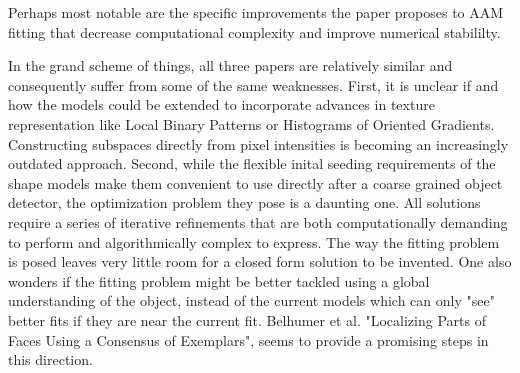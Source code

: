 \documentclass[12pt]{article}
\begin{document}
Perhaps most notable are the specific improvements the paper proposes to AAM fitting that decrease computational complexity and improve numerical stabililty.
\par
In the grand scheme of things, all three papers are relatively similar and consequently suffer from some of the same weaknesses.
First, it is unclear if and how the models could be extended to incorporate advances in texture representation like Local Binary Patterns or Histograms of Oriented Gradients.
Constructing subspaces directly from pixel intensities is becoming an increasingly outdated approach.
Second, while the flexible inital seeding requirements of the shape models make them convenient to use directly after a coarse grained object detector, the optimization problem they pose is a daunting one.
All solutions require a series of iterative refinements that are both computationally demanding to perform and algorithmically complex to express.
The way the fitting problem is posed leaves very little room for a closed form solution to be invented.
One also wonders if the fitting problem might be better tackled using a global understanding of the object, instead of the current models which can only "see" better fits if they are near the current fit.
Belhumer et al. "Localizing Parts of Faces Using a Consensus of Exemplars", seems to provide a promising steps in this direction.
 
\end{document}
